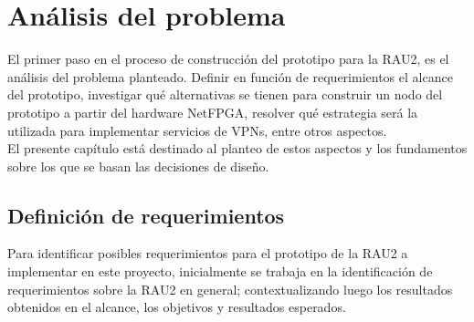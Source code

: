 \chapter{An\'alisis del problema}

\ifpdf
    \graphicspath{{Chapter3/Figs/Raster/}{Chapter3/Figs/PDF/}{Chapter3/Figs/}}
\else
    \graphicspath{{Chapter3/Figs/Vector/}{Chapter3/Figs/}}
\fi

El primer paso en el proceso de construcción del prototipo para la RAU2, es el análisis del problema planteado. Definir en función de requerimientos el alcance del prototipo, investigar qu\'e alternativas se tienen para construir un nodo del prototipo a partir del hardware NetFPGA, resolver qu\'e estrategia ser\'a la utilizada para implementar servicios de VPNs, entre otros aspectos.\\

El presente cap\'itulo est\'a destinado al planteo de estos aspectos y los fundamentos sobre los que se basan las decisiones de diseño. 




\section[Definición de requerimientos]{Definición de requerimientos}
\label{3.1}

Para identificar posibles requerimientos para el prototipo de la RAU2 a implementar en este proyecto, inicialmente se trabaja en la identificación de requerimientos sobre la RAU2 en general; contextualizando luego los resultados obtenidos en el alcance, los objetivos y resultados esperados.\\

